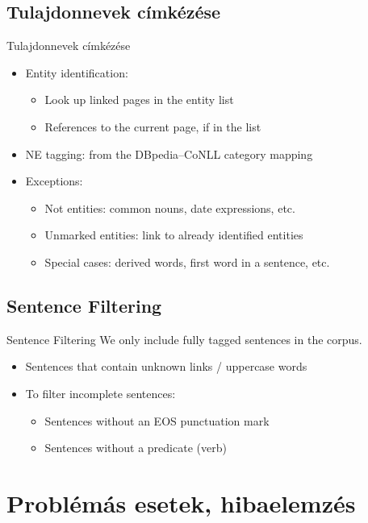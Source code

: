\documentclass[utf8x,t]{beamer}
\newcommand{\vitem}{\item \vspace{4pt}}
\begin{document}
\subsection{Tulajdonnevek címkézése}
\begin{frame}{Tulajdonnevek címkézése}
  \bigskip
  \begin{itemize}
  \vitem Entity identification:
    \begin{itemize}
    \vitem Look up linked pages in the entity list
    \vitem References to the current page, if in the list
    \end{itemize}
  \vitem NE tagging: from the DBpedia--CoNLL category mapping
  \vitem Exceptions:
    \begin{itemize}
    \vitem Not entities: common nouns, date expressions, etc.
    \vitem Unmarked entities: link to already identified entities
    \vitem Special cases: derived words, first word in a sentence, etc.
    \end{itemize}
  \end{itemize}
\end{frame}

\subsection{Sentence Filtering}
\begin{frame}{Sentence Filtering}
  \bigskip
  We only include fully tagged sentences in the corpus.
  \smallskip
  \begin{itemize}
  \vitem Sentences that contain unknown links / uppercase words
  \vitem To filter incomplete sentences:
    \begin{itemize}
    \vitem Sentences without an EOS punctuation mark
    \vitem Sentences without a predicate (verb)
    \end{itemize}
  \end{itemize}
\end{frame}

\section{Problémás esetek, hibaelemzés}

\end{document}

